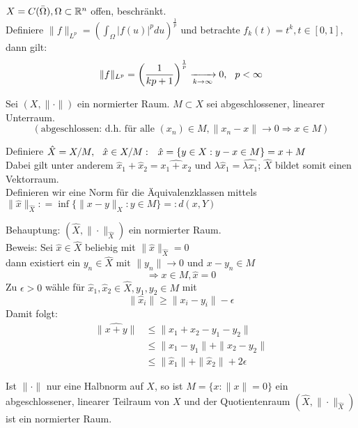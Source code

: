 \begin{beispiel}
$X = C(\bar\Omega), \Omega \subset \mathbb{R}^{n}$ offen, beschränkt. \\
Definiere $\| f \|_{L^{p}} = \left( \int_{\Omega} |f(u)|^{p} du \right)^{\frac{1}{p}}$ und betrachte $f_{k}(t) = t^k, t \in [0, 1]$, dann gilt:
 \[ \| f \|_{L^{p}} = \left( \frac{1}{kp + 1} \right)^{\frac{1}{p}} \xrightarrow[k \rightarrow \infty]{} 0, \hspace{0.25cm} p < \infty \]
\end{beispiel}

\begin{definition} \label{def:1-2.15}
Sei $(X, \| \cdot \|)$ ein normierter Raum. $M \subset X$ sei abgeschlossener, linearer Unterraum. \[ (\text{abgeschlossen: d.h. für alle } (x_{n}) \in M, \| x_{n} - x \| \rightarrow 0 \Rightarrow x \in M) \]

Definiere $\hat X = X / M, \hspace{0.25cm} \hat x \in X/M: \hspace{0.25cm} \hat x = \{ y \in X: y - x \in M \} = x + M$ \\
Dabei gilt unter anderem $\hat x_{1} + \hat x_{2} = \widehat{x_{1} + x_{2}}$ und $\lambda \hat x_{1} = \widehat{\lambda x_{1}}$; $\hat X$ bildet somit einen Vektorraum. \\
Definieren wir eine Norm für die Äquivalenzklassen mittels $\| \hat x \|_{\hat X} : = \inf \{ \| x - y \|_{X}: y \in M \} =: d(x, Y)$

Behauptung: $(\hat X, \| \cdot \|_{\hat X})$ ein normierter Raum. \\
Beweis: Sei $\hat x \in \hat X$ beliebig mit $\| \hat x \|_{\hat X} = 0$ \\
 dann existiert ein $y_{n} \in \hat X \text{ mit } \| y_{n} \| \rightarrow 0$ und $x - y_{n} \in M$
	\[ \Rightarrow x \in M, \hat x = 0 \]
Zu $\epsilon > 0$ wähle für $\hat x_{1}, \hat x_{2} \in \hat X, y_{1}, y_{2} \in M$ mit
	\[ \| \hat x_{i} \| \geq \| x_{i} - y_{i} \| - \epsilon \] 
	Damit folgt:
	\begin{align*}
		\| \widehat{x + y} \| & \leq \| x_{1} + x_{2} - y_{1} - y_{2} \| \\
						  & \leq \| x_{1} - y_{1} \| + \| x_{2} - y_{2} \| \\
						  & \leq \| \hat x_{1} \| + \| \hat x_{2} \| + 2 \epsilon
	\end{align*}
\end{definition}

\begin{bemerkung}
Ist $\| \cdot \|$ nur eine Halbnorm auf $X$, so ist $M = \{ x: \| x \| = 0 \}$ ein abgeschlossener, linearer Teilraum von $X$ und der Quotientenraum $(\hat X, \| \cdot \|_{\hat X})$ ist ein normierter Raum.
\end{bemerkung}


